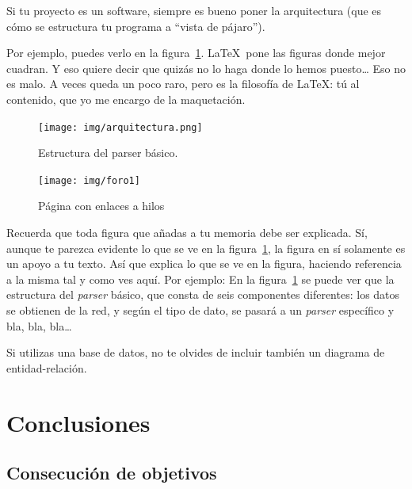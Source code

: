 \documentclass[a4paper, 12pt]{book}
\begin{document}
Si tu proyecto es un software, siempre es bueno poner la arquitectura (que es cómo se estructura tu programa a ``vista de pájaro'').

Por ejemplo, puedes verlo en la figura~\ref{fig:arquitectura}.
\LaTeX \ pone las figuras donde mejor cuadran. 
Y eso quiere decir que quizás no lo haga donde lo hemos puesto\ldots
Eso no es malo.
A veces queda un poco raro, pero es la filosofía de \LaTeX: tú al contenido, que yo me encargo de la maquetación.

\begin{figure}
  \centering
  \texttt{[image: img/arquitectura.png]}
  \caption{Estructura del parser básico.}\label{fig:arquitectura}
\end{figure}

\begin{figure}
    \centering
    \texttt{[image: img/foro1]}
    \caption{Página con enlaces a hilos}\label{fig:_arquitectura}
\end{figure}

 
Recuerda que toda figura que añadas a tu memoria debe ser explicada.
Sí, aunque te parezca evidente lo que se ve en la figura~\ref{fig:arquitectura}, la figura en sí solamente es un apoyo a tu texto.
Así que explica lo que se ve en la figura, haciendo referencia a la misma tal y como ves aquí.
Por ejemplo: En la figura~\ref{fig:arquitectura} se puede ver que la estructura del \emph{parser} básico, que consta de seis componentes diferentes: los datos se obtienen de la red, y según el tipo de dato, se pasará a un \emph{parser} específico y bla, bla, bla\ldots

Si utilizas una base de datos, no te olvides de incluir también un diagrama de entidad-relación.




\cleardoublepage
\chapter{Conclusiones}
\label{chap:conclusiones}


\section{Consecución de objetivos}
\label{sec:consecucion-objetivos}
\end{document}
